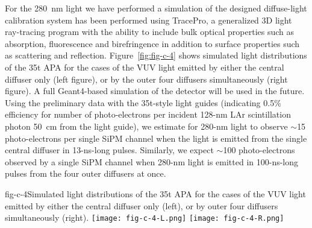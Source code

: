 For the 280~nm light we have performed a simulation of the designed
diffuse-light calibration system has been performed using TracePro, a
generalized 3D light ray-tracing program with the ability to include
bulk optical properties such as absorption, fluorescence and
birefringence in addition to surface properties such as scattering and
reflection. Figure~\ref{fig:fig-c-4} shows simulated light
distributions of the 35t APA for the cases of the VUV light emitted by
either the central diffuser only (left figure), or by the outer four
diffusers simultaneously (right figure). A full Geant4-based
simulation of the detector will be used in the future. Using the
preliminary data with the 35t-style light guides (indicating 0.5\%
efficiency for number of photo-electrons per incident 128-nm LAr
scintillation photon 50~cm from the light guide), we estimate for
280-nm light to observe $\sim$15 photo-electrons per single SiPM
channel when the light is emitted from the single central diffuser in
13-ns-long pulses. Similarly, we expect $\sim$100 photo-electrons
observed by a single SiPM channel when 280-nm light is emitted in
100-ns-long pulses from the four outer diffusers at once.

%
\begin{cdrfigure}{fig-c-4}{Simulated light distributions of the 35t APA for the cases of the VUV light emitted by either the central diffuser only
  (left), or by outer four diffusers simultaneously (right).}
\texttt{[image: fig-c-4-L.png]}
\texttt{[image: fig-c-4-R.png]}
\end{cdrfigure}

